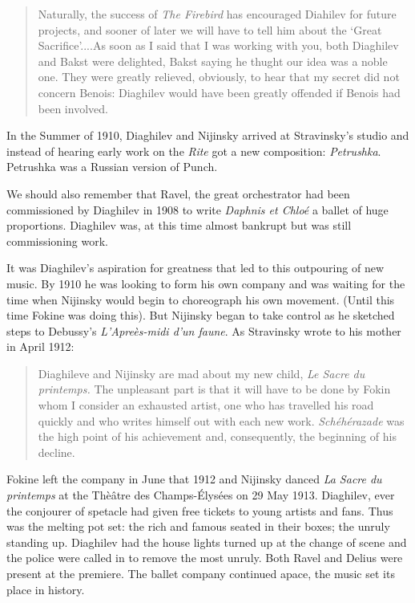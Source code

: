 \begin{quotation}
Naturally, the success of \textit{The Firebird} has encouraged Diahilev for future projects, and sooner of later we will have to tell him about the `Great Sacrifice'....As soon as I said that I was working with you, both Diaghilev and Bakst were delighted, Bakst saying he thught our idea was a noble one. They were greatly relieved, obviously, to hear that my secret did not concern Benois: Diaghilev would have been greatly offended if Benois had been involved.
\end{quotation}

In the Summer of 1910, Diaghilev and Nijinsky arrived at Stravinsky's studio and instead of hearing early work on the \textit{Rite} got a new composition: \textit{Petrushka}. Petrushka was a Russian version of Punch. 

We should also remember that Ravel, the great orchestrator had been commissioned by Diaghilev in 1908 to write \textit{Daphnis et Chlo\'e} a ballet of huge proportions. Diaghilev was, at this time almost bankrupt but was still commissioning work. 

It was Diaghilev's aspiration for greatness that led to this outpouring of new music. By 1910 he was looking to form his own company and was waiting for the time when Nijinsky would begin to choreograph his own movement. (Until this time Fokine was doing this). But Nijinsky began to take control as he sketched steps to Debussy's \textit{L'Apre\`es-midi d'un faune}. As Stravinsky wrote to his mother in April 1912:

\begin{quotation}
Diaghileve and Nijinsky are mad about my new child, \textit{Le Sacre du printemps.} The unpleasant part is that it will have to be done by Fokin whom I consider an exhausted artist, one who has travelled his road quickly and who writes himself out with each new work. \textit{Sch\'eh\'erazade} was the high point of his achievement and, consequently, the beginning of his decline.
\end{quotation}

Fokine left the company in June that 1912 and Nijinsky danced \textit{La Sacre du printemps} at the Th\`e\^atre des Champs-\'Elys\'ees on 29 May 1913. Diaghilev, ever the conjourer of spetacle had given free tickets to young artists and fans. Thus was the melting pot set: the rich and famous seated in their boxes; the unruly standing up. Diaghilev had the house lights turned up at the change of scene and the police were called in to remove the most unruly. Both Ravel and Delius were present at the premiere. The ballet company continued apace, the music set its place in history. 

